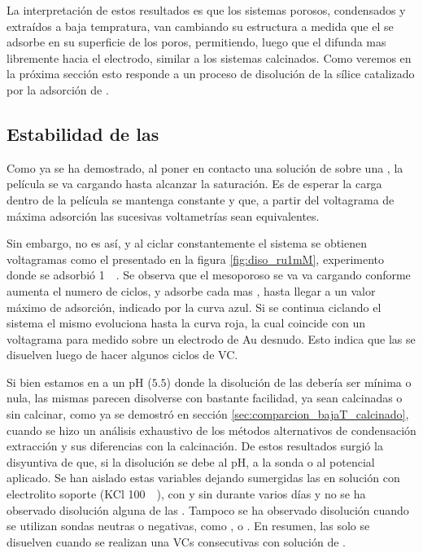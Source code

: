 		La interpretación de estos resultados es que los sistemas porosos, condensados y extraídos a baja tempratura, van cambiando su estructura a medida que el \ru\space se adsorbe en su superficie de los poros, permitiendo, luego que el \fc\space difunda mas libremente hacia el electrodo, similar a los sistemas calcinados. Como veremos en la próxima sección esto responde a un proceso de disolución de la sílice catalizado por la adsorción de \aminorutenio.

	\subsection{Estabilidad de las \pdmF}

		Como ya se ha demostrado, al poner en contacto una solución de \ru\space sobre una \pdmF, la película se va cargando hasta alcanzar la saturación. Es de esperar la carga dentro de la película se mantenga constante y que, a partir del voltagrama de máxima adsorción las sucesivas voltametrías sean equivalentes.

		Sin embargo, no es así, y al ciclar constantemente el sistema se obtienen voltagramas como el presentado en la figura \ref{fig:diso_ru1mM}, experimento donde se adsorbió \ru\space \SI{1}{\milli\Molar}. Se observa que el mesoporoso se va va cargando conforme aumenta el numero de ciclos, y adsorbe cada mas \ru, hasta llegar a un valor máximo de adsorción, indicado por la curva azul. Si se continua ciclando el sistema el mismo evoluciona hasta la curva roja, la cual coincide con un voltagrama para \ru\space medido sobre un electrodo de Au desnudo. Esto indica que las \pdmF\space se disuelven luego de hacer algunos ciclos de VC.

		Si bien estamos en a un pH ($5.5$) donde la disolución de las \pdmF\space debería ser mínima o nula, las mismas parecen disolverse con bastante \marginpar{\color{red}{Esta seccion la tengo que colorcar en l capitulo de mesoporosos, donde comparo los sistemas calcinados con los hechos a bajas T.}}facilidad, ya sean \pdmF\space calcinadas o sin calcinar, como ya se demostró en sección \ref{sec:comparcion_bajaT_calcinado}, cuando se hizo un análisis exhaustivo de los métodos alternativos de condensación extracción y sus diferencias con la calcinación. De estos resultados surgió la disyuntiva de que, si la disolución se debe al pH, a la sonda o al potencial aplicado. Se han aislado estas variables dejando sumergidas las \pdmF\space en solución con electrolito soporte (KCl \SI{100}{\milli\Molar}), con y sin \ru\space durante varios días y no se ha observado disolución alguna de las \pdm. Tampoco se ha observado disolución cuando se utilizan sondas neutras o negativas, como \fe, \hq\space o \fc. En resumen, las \pdmF\space solo se disuelven cuando se realizan una VCs consecutivas con solución de \ru\space.
			
